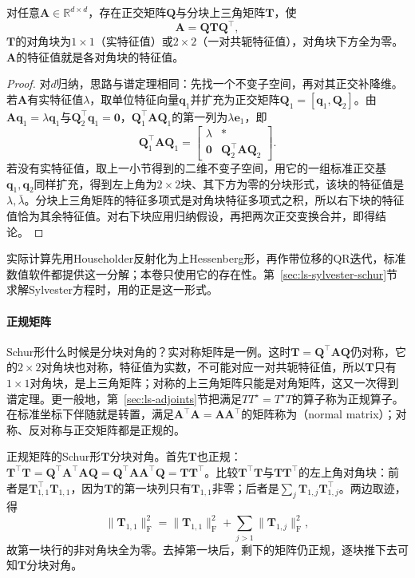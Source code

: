 \begin{theorem}[实Schur形]
\label{thm:ls-real-schur}
对任意$\bm A\in\mathbb R^{d\times d}$，存在正交矩阵$\bm Q$与分块上三角矩阵$\bm T$，使
\begin{equation}
 \bm A=\bm Q\bm T\bm Q^{\top},
 \label{eq:matrix-analysis-schur-decomposition}
\end{equation}
$\bm T$的对角块为$1\times1$（实特征值）或$2\times2$（一对共轭特征值），对角块下方全为零。$\bm A$的特征值就是各对角块的特征值。
\end{theorem}
\begin{proof}
对$d$归纳，思路与谱定理相同：先找一个不变子空间，再对其正交补降维。若$\bm A$有实特征值$\lambda$，取单位特征向量$\bm q_1$并扩充为正交矩阵$\bm Q_1=[\bm q_1,\bm Q_2]$。由$\bm A\bm q_1=\lambda\bm q_1$与$\bm Q_2^\top\bm q_1=\bm0$，$\bm Q_1^\top\bm A\bm Q_1$的第一列为$\lambda\bm e_1$，即
\[
 \bm Q_1^\top\bm A\bm Q_1=\begin{bmatrix}\lambda&*\\\bm0&\bm Q_2^\top\bm A\bm Q_2\end{bmatrix}.
\]
若没有实特征值，取上一小节得到的二维不变子空间，用它的一组标准正交基$\bm q_1,\bm q_2$同样扩充，得到左上角为$2\times2$块、其下方为零的分块形式，该块的特征值是$\lambda,\bar\lambda$。分块上三角矩阵的特征多项式是对角块特征多项式之积，所以右下块的特征值恰为其余特征值。对右下块应用归纳假设，再把两次正交变换合并，即得结论。
\end{proof}
实际计算先用Householder反射化为上Hessenberg形，再作带位移的QR迭代，标准数值软件都提供这一分解；本卷只使用它的存在性。第~\ref{sec:ls-sylvester-schur}节求解Sylvester方程时，用的正是这一形式。

\paragraph{正规矩阵}

Schur形什么时候是分块对角的？实对称矩阵是一例。这时$\bm T=\bm Q^\top\bm A\bm Q$仍对称，它的$2\times2$对角块也对称，特征值为实数，不可能对应一对共轭特征值，所以$\bm T$只有$1\times1$对角块，是上三角矩阵；对称的上三角矩阵只能是对角矩阵，这又一次得到谱定理。更一般地，第~\ref{sec:ls-adjoints}节把满足$TT^\star=T^\star T$的算子称为正规算子。在标准坐标下伴随就是转置，满足$\bm A^\top\bm A=\bm A\bm A^\top$的矩阵称为（normal matrix）；对称、反对称与正交矩阵都是正规的。

正规矩阵的Schur形$\bm T$分块对角。首先$\bm T$也正规：$\bm T^\top\bm T=\bm Q^\top\bm A^\top\bm A\bm Q=\bm Q^\top\bm A\bm A^\top\bm Q=\bm T\bm T^\top$。比较$\bm T^\top\bm T$与$\bm T\bm T^\top$的左上角对角块：前者是$\bm T_{1,1}^\top\bm T_{1,1}$，因为$\bm T$的第一块列只有$\bm T_{1,1}$非零；后者是$\sum_j\bm T_{1,j}\bm T_{1,j}^\top$。两边取迹，得
\[
 \lVert\bm T_{1,1}\rVert_{\mathrm F}^2=\lVert\bm T_{1,1}\rVert_{\mathrm F}^2+\sum_{j>1}\lVert\bm T_{1,j}\rVert_{\mathrm F}^2 ,
\]
故第一块行的非对角块全为零。去掉第一块后，剩下的矩阵仍正规，逐块推下去可知$\bm T$分块对角。

